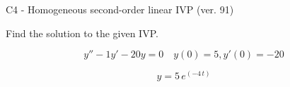 \begin{exercise}
  \begin{exerciseTitle}C4 - Homogeneous second-order linear IVP (ver. 91)\end{exerciseTitle}
  \begin{exerciseStatement}
    
Find the solution to the given IVP.

    
\[y''-1y'-20y = 0 \hspace{1em} y(0) = 5 , y'(0) = -20\]

  \end{exerciseStatement}
  \begin{exerciseAnswer}
    
\[y= 5 \, e^{\left(-4 \, t\right)}\]

  \end{exerciseAnswer}
\end{exercise}